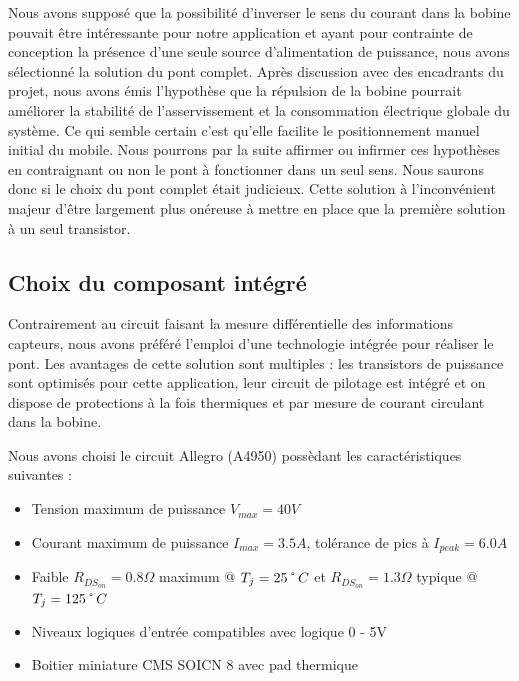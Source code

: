 \documentclass[11pt, french]{article} %
\begin{document}
Nous avons supposé que la possibilité d'inverser le sens du courant dans la bobine pouvait être intéressante pour notre application et ayant pour contrainte de conception la présence d'une seule source d'alimentation de puissance, nous avons sélectionné la solution du pont complet. Après discussion avec des encadrants du projet, nous avons émis l'hypothèse que la répulsion de la bobine pourrait améliorer la stabilité de l'asservissement et la consommation électrique globale du système. Ce qui semble certain c'est qu'elle facilite le positionnement manuel initial du mobile. Nous pourrons par la suite affirmer ou infirmer ces hypothèses en contraignant ou non le pont à fonctionner dans un seul sens. Nous saurons donc si le choix du pont complet était judicieux. Cette solution à l'inconvénient majeur d'être largement plus onéreuse à mettre en place que la première solution à un seul transistor.

\subsection{Choix du composant intégré}

Contrairement au circuit faisant la mesure différentielle des informations capteurs, nous avons préféré l'emploi d'une technologie intégrée pour réaliser le pont. Les avantages de cette solution sont multiples : les transistors de puissance sont optimisés pour cette application, leur circuit de pilotage est intégré et on dispose de protections à la fois thermiques et par mesure de courant circulant dans la bobine.

\medskip
\noindent
Nous avons choisi le circuit Allegro (A4950) possèdant les caractéristiques suivantes :
\medskip
\begin{itemize}
	\item Tension maximum de puissance $ V_{max} = 40 V $
	\item Courant maximum de puissance $ I_{max} = 3.5 A $, tolérance de pics à $ I_{peak} = 6.0 A$
	\item Faible $R_{DS_{on}} = 0.8 \Omega $ maximum @ $ T_j = 25 \char23 C $ \newline
	et $R_{DS_{on}} = 1.3 \Omega $ typique @ $ T_j = 125 \char23 C $
	\item Niveaux logiques d'entrée compatibles avec logique 0 - 5V
	\item Boitier miniature CMS SOICN 8 avec pad thermique
\end {itemize}
\end{document}

